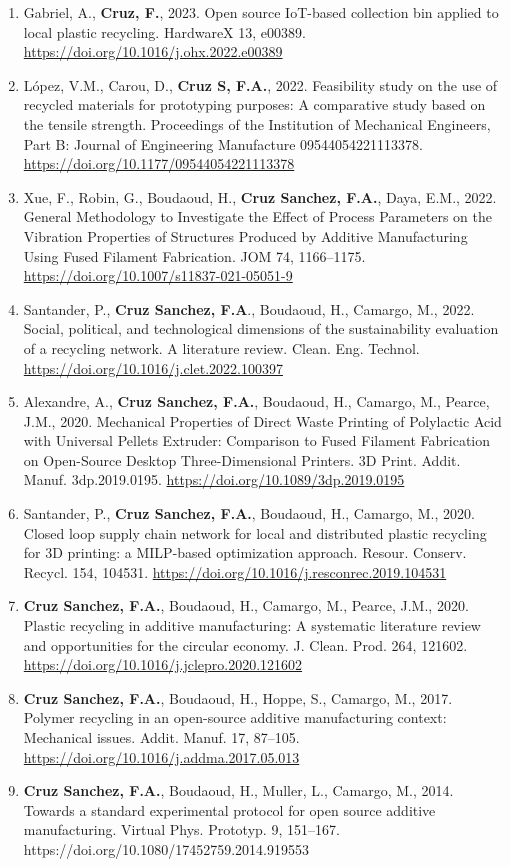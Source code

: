 \documentclass[
  11pt,
]{article}
\begin{document}
\begin{enumerate}
\def\labelenumi{\arabic{enumi}.}
\item
  Gabriel, A., \textbf{Cruz, F.}, 2023. Open source IoT-based collection
  bin applied to local plastic recycling. HardwareX 13, e00389.
  \url{https://doi.org/10.1016/j.ohx.2022.e00389}
\item
  López, V.M., Carou, D., \textbf{Cruz S, F.A.}, 2022. Feasibility study
  on the use of recycled materials for prototyping purposes: A
  comparative study based on the tensile strength. Proceedings of the
  Institution of Mechanical Engineers, Part B: Journal of Engineering
  Manufacture 09544054221113378.
  \url{https://doi.org/10.1177/09544054221113378}
\item
  Xue, F., Robin, G., Boudaoud, H., \textbf{Cruz Sanchez, F.A.}, Daya,
  E.M., 2022. General Methodology to Investigate the Effect of Process
  Parameters on the Vibration Properties of Structures Produced by
  Additive Manufacturing Using Fused Filament Fabrication. JOM 74,
  1166--1175. \url{https://doi.org/10.1007/s11837-021-05051-9}
\item
  Santander, P., \textbf{Cruz Sanchez, F.A}., Boudaoud, H., Camargo, M.,
  2022. Social, political, and technological dimensions of the
  sustainability evaluation of a recycling network. A literature review.
  Clean. Eng. Technol. \url{https://doi.org/10.1016/j.clet.2022.100397}
\item
  Alexandre, A., \textbf{Cruz Sanchez, F.A.}, Boudaoud, H., Camargo, M.,
  Pearce, J.M., 2020. Mechanical Properties of Direct Waste Printing of
  Polylactic Acid with Universal Pellets Extruder: Comparison to Fused
  Filament Fabrication on Open-Source Desktop Three-Dimensional
  Printers. 3D Print. Addit. Manuf. 3dp.2019.0195.
  \url{https://doi.org/10.1089/3dp.2019.0195}
\item
  Santander, P., \textbf{Cruz Sanchez, F.A.}, Boudaoud, H., Camargo, M.,
  2020. Closed loop supply chain network for local and distributed
  plastic recycling for 3D printing: a MILP-based optimization approach.
  Resour. Conserv. Recycl. 154, 104531.
  \url{https://doi.org/10.1016/j.resconrec.2019.104531}
\item
  \textbf{Cruz Sanchez, F.A.}, Boudaoud, H., Camargo, M., Pearce, J.M.,
  2020. Plastic recycling in additive manufacturing: A systematic
  literature review and opportunities for the circular economy. J.
  Clean. Prod. 264, 121602.
  \url{https://doi.org/10.1016/j.jclepro.2020.121602}
\item
  \textbf{Cruz Sanchez, F.A.}, Boudaoud, H., Hoppe, S., Camargo, M.,
  2017. Polymer recycling in an open-source additive manufacturing
  context: Mechanical issues. Addit. Manuf. 17, 87--105.
  \url{https://doi.org/10.1016/j.addma.2017.05.013}
\item
  \textbf{Cruz Sanchez, F.A.}, Boudaoud, H., Muller, L., Camargo, M.,
  2014. Towards a standard experimental protocol for open source
  additive manufacturing. Virtual Phys. Prototyp. 9, 151--167.
  https://doi.org/10.1080/17452759.2014.919553
\end{enumerate}
\end{document}
